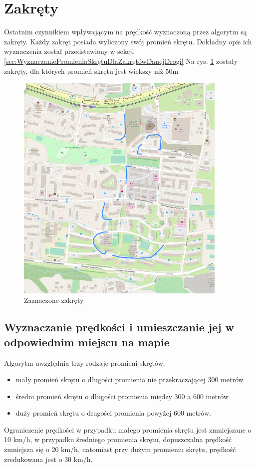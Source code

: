 \section{Zakręty}
\label{sec:zakretyMain}
Ostatnim czynnikiem wpływającym na prędkość wyznaczoną przez algorytm są zakręty. Każdy zakręt posiada wyliczony swój promień skrętu. Dokładny opis ich wyznaczenia został przedstawiony w sekcji \ref{sec:WyznaczaniePromieniaSkrętuDlaZakrętówDanejDrogi}
Na rys. \ref{sec:zakrety} zostały zakręty, dla których promień skrętu jest większy niż 50m
\begin{figure}[h]
\caption{Zaznaczone zakręty}
\label{sec:zakrety}
\centering
\includegraphics[width=0.9\textwidth]{zakrety}
\end{figure}

\newpage
\subsection{Wyznaczanie prędkości i umieszczanie jej w odpowiednim miejscu na mapie}
Algorytm uwzględnia trzy rodzaje promieni skrętów: 
\begin{itemize}
\item mały promień skrętu o długości promienia nie przekraczającej 300 metrów
\item średni promień skrętu o długości promienia między 300 a 600 metrów
\item duży promień skrętu o długości promienia powyżej 600 metrów.
\end{itemize}
Ograniczenie prędkości w przypadku małego promienia skrętu jest zmniejszane o 10 km/h, w przypadku średniego promienia skrętu, dopuszczalna prędkość zmniejsza się o 20 km/h, natomiast przy dużym promieniu skrętu, prędkość zredukowana jest o 30 km/h. 

